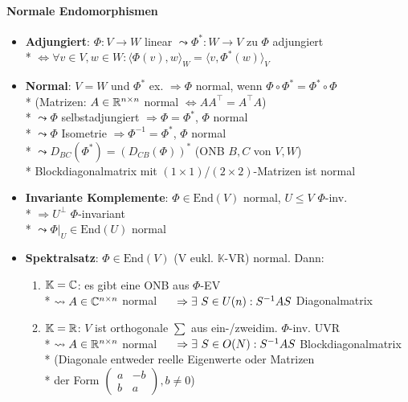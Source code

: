 \paragraph{Normale Endomorphismen}
\begin{itemize}
	\item \textbf{Adjungiert}: \( \Phi: V \to W \) linear \( \leadsto \Phi^\ast: W \to V \) zu \( \Phi \) adjungiert
		\\*
		\( \Leftrightarrow \forall v \in V, w \in W: \langle \Phi(v),w \rangle_W = \langle v,\Phi^\ast(w) \rangle_V \)
	\item \textbf{Normal}: \( V = W \) und \( \Phi^\ast \) ex. \( \Rightarrow \Phi \) normal, wenn \( \Phi \circ \Phi^\ast = \Phi^\ast \circ \Phi \)
		\\*
		(Matrizen: \( A \in \mathbb{R}^{n \times n} \) normal \( \Leftrightarrow AA^\top  = A^\top A \))
		\\*
		\( \leadsto \Phi \) selbstadjungiert \( \Rightarrow \Phi = \Phi^\ast \), \( \Phi \) normal
		\\*
		\( \leadsto \Phi \) Isometrie \( \Rightarrow \Phi^{-1} = \Phi^\ast \), \( \Phi \) normal
		\\*
		\( \leadsto D_{BC}(\Phi^\ast) = \left(D_{CB}(\Phi)\right)^\ast \) (ONB \( B,C \) von \( V,W \))
		\\*
		Blockdiagonalmatrix mit \( (1 \times 1) \)/\( (2 \times 2) \)-Matrizen ist normal
	\item \textbf{Invariante Komplemente}: \( \Phi \in \text{End}(V) \) normal, \( U \leq V \) \( \Phi \)-inv.
		\\*
		\( \Rightarrow U^\perp \) \( \Phi \)-invariant
		\\*
		\( \leadsto \Phi|_U \in \text{End}(U) \) normal
	\item \textbf{Spektralsatz}: \( \Phi \in \text{End}(V) \) (V eukl. \( \mathbb{K} \)-VR) normal. Dann:
		\begin{enumerate}
			\item \( \mathbb{K}=\mathbb{C} \): es gibt eine ONB aus \( \Phi \)-EV
				\\*
				\( \leadsto A \in \mathbb{C}^{n \times n} \) normal \( \\* \phantom{xx} \Rightarrow \exists \ S \in U(n): S^{-1}AS \) Diagonalmatrix
			\item \( \mathbb{K}=\mathbb{R} \): \( V \) ist orthogonale \( \sum \) aus ein-/zweidim. \( \Phi \)-inv. UVR
				\\*
				\( \leadsto A \in \mathbb{R}^{n \times n} \) normal \( \\* \phantom{xx} \Rightarrow \exists \ S \in O(N): S^{-1}AS \) Blockdiagonalmatrix \\* \phantom{xx} (Diagonale entweder reelle Eigenwerte oder Matrizen \\* \phantom{xx} der Form \( \left( \begin{smallmatrix}
					a & -b \\
					b & a
				\end{smallmatrix} \right), b \neq 0 \))
		\end{enumerate}
\end{itemize}